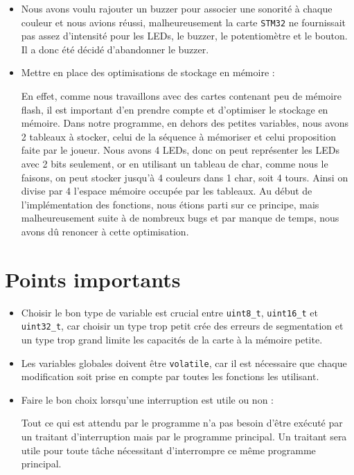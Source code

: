 \documentclass[10pt,a4,french]{article}
\begin{document}
\begin{itemize}
	\item Nous avons voulu rajouter un buzzer pour associer une sonorité à chaque couleur et nous avions réussi,
		malheureusement la carte \texttt{STM32} ne fournissait pas assez d'intensité pour les LEDs, le buzzer, le potentiomètre et le bouton.
		Il a donc été décidé d'abandonner le buzzer.
	\item Mettre en place des optimisations de stockage en mémoire :

		En effet, comme nous travaillons avec des cartes contenant peu de mémoire flash,
		il est important d'en prendre compte et d'optimiser le stockage en mémoire.
		Dans notre programme, en dehors des petites variables, nous avons 2 tableaux à stocker,
		celui de la séquence à mémoriser et celui proposition faite par le joueur.
		Nous avons 4 LEDs, donc on peut représenter les LEDs avec 2 bits seulement, or en utilisant un tableau de char,
		comme nous le faisons, on peut stocker jusqu'à 4 couleurs dans 1 char, soit 4 tours.
		Ainsi on divise par 4 l'espace mémoire occupée par les tableaux.
		Au début de l'implémentation des fonctions, nous étions parti sur ce principe,
		mais malheureusement suite à de nombreux bugs et par manque de temps, nous avons dû renoncer à cette optimisation.
\end{itemize}

\section{Points importants}

\begin{itemize}
	\item Choisir le bon type de variable est crucial entre \texttt{uint8\_t}, \texttt{uint16\_t} et \texttt{uint32\_t}, car choisir un type trop petit crée des erreurs de segmentation et un type trop grand limite les capacités de la carte à la mémoire petite.
	\item Les variables globales doivent être \texttt{volatile}, car il est nécessaire que chaque modification soit prise en compte par toutes les fonctions les utilisant.
	\item Faire le bon choix lorsqu'une interruption est utile ou non :

		Tout ce qui est attendu par le programme n'a pas besoin d'être exécuté par un traitant d'interruption mais par le programme principal.
		Un traitant sera utile pour toute tâche nécessitant d'interrompre ce même programme principal.
\end{itemize}
\end{document}
